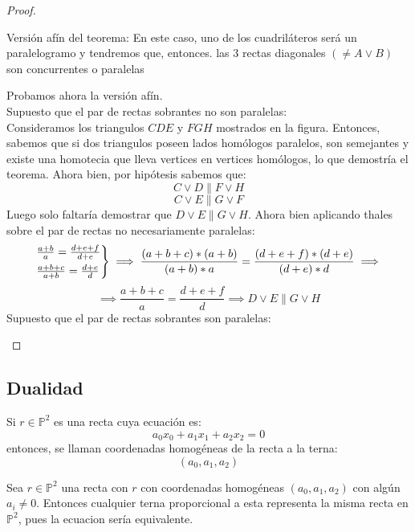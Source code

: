 \begin{proof} \hfill
	\begin{nlist}
	\item Versión afín del teorema: En este caso, uno de los cuadriláteros será un paralelogramo y tendremos que, entonces. las 3 rectas diagonales $(\ne A\vee B)$ son concurrentes o paralelas
	\item Probamos ahora la versión afín.\\
	Supuesto que el par de rectas sobrantes no son paralelas:\\
	Consideramos los triangulos $CDE$ y $FGH$ mostrados en la figura. Entonces, sabemos que si dos triangulos poseen lados homólogos paralelos, son semejantes y existe una homotecia que lleva vertices en vertices homólogos, lo que demostría el teorema.
	Ahora bien, por hipótesis sabemos que:
	$$C \vee D \parallel F \vee H$$
	$$C \vee E \parallel G \vee F$$
	Luego solo faltaría demostrar que $D \vee E \parallel G \vee H$. Ahora bien aplicando thales sobre el par de rectas no necesariamente paralelas:
	\[
	\begin{rcases}
		\frac{a+b}{a} = \frac{d+e+f}{d+e}\\
		\frac{a+b+c}{a+b} = \frac{d+e}{d}
\end{rcases} \implies \frac{(a+b+c)*(a+b)}{(a+b)*a} = \frac{(d+e+f)*(d+e)}{(d+e)*d} \implies
\]
$$\implies \frac{a+b+c}{a} = \frac{d+e+f}{d} \implies D \vee E \parallel G \vee H$$
Supuesto que el par de rectas sobrantes son paralelas:
\end{nlist}
\end{proof}

\subsection{Dualidad}

\begin{ndef}
	Si $r \in \mathbb P ^2$ es una recta cuya ecuación es:
	\[
	a_0x_0 + a_1x_1 + a_2 x_2 = 0
	\]
	entonces, se llaman coordenadas homogéneas de la recta a la terna:
	\[
	(a_0,a_1,a_2)
	\]
\end{ndef}

Sea $r \in \mathbb P ^2$ una recta con $r$ con coordenadas homogéneas $(a_0,a_1,a_2)$  con algún $a_i \ne 0$. Entonces cualquier terna proporcional a esta representa la misma recta en $\mathbb{P}^2$, pues la ecuacion sería equivalente.

